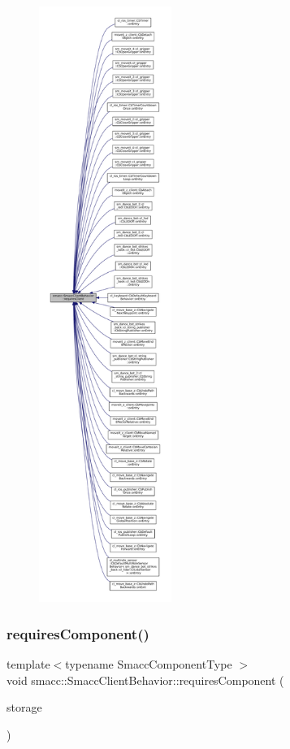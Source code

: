 \begin{figure}[H]
\begin{center}
\leavevmode
\includegraphics[height=550pt]{classsmacc_1_1SmaccClientBehavior_a917f001e763a1059af337bf4e164f542_icgraph}
\end{center}
\end{figure}
\mbox{\label{classsmacc_1_1SmaccClientBehavior_adee6abe3a28aa6b47d3dd5267e264b4d}} 
\subsubsection{\texorpdfstring{requires\+Component()}{requiresComponent()}}
{\footnotesize\ttfamily template$<$typename Smacc\+Component\+Type $>$ \\
void smacc\+::\+Smacc\+Client\+Behavior\+::requires\+Component (\begin{DoxyParamCaption}\item[{Smacc\+Component\+Type $\ast$\&}]{storage }\end{DoxyParamCaption})}



